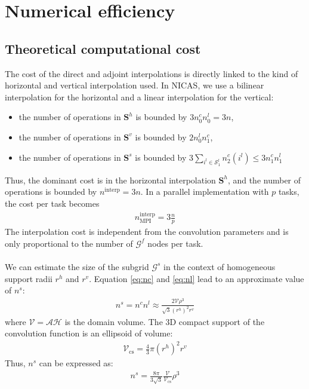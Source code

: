 \documentclass[12pt]{scrartcl}
\begin{document}
\section{Numerical efficiency}

\subsection{Theoretical computational cost}
The cost of the direct and adjoint interpolations is directly linked to the kind of horizontal and vertical interpolation used. In NICAS, we use a bilinear interpolation for the horizontal and a linear interpolation for the vertical:
\begin{itemize}
\item the number of operations in $\mathbf{S}^h$ is bounded by $3 n^c_0 n^l_0 = 3n$,
\item the number of operations in $\mathbf{S}^v$ is bounded by $2 n^l_0 n^c_1$,
\item the number of operations in $\mathbf{S}^s$ is bounded by $\displaystyle 3 \sum_{i^l \in \mathcal{S}^l_1} n^c_2(i^l) \le 3 n^c_1 n^l_1$
\end{itemize}
Thus, the dominant cost is in the horizontal interpolation $\mathbf{S}^h$, and the number of operations is bounded by $n^\mathrm{interp} = 3n$. In a parallel implementation with $p$ tasks, the cost per task becomes 
\begin{align}
n^\mathrm{interp}_\mathrm{MPI} = 3 \frac{n}{p}
\end{align}
The interpolation cost is independent from the convolution parameters and is only proportional to the number of $\mathcal{G}^f$ nodes per task.\\
$  $\\
We can estimate the size of the subgrid $\mathcal{G}^s$ in the context of homogeneous support radii $r^h$ and $r^v$. Equation \ref{eq:nc} and \ref{eq:nl} lead to an approximate value of $n^s$:
\begin{align}
n^s = n^c n^l \approx \frac{2 \mathcal{V} \rho^3}{\sqrt{3} \left(r^h\right)^2 r^v}
\end{align}
where $\mathcal{V} = \mathcal{A} \mathcal{H}$ is the domain volume. The 3D compact support of the convolution function is an ellipsoid of volume:
\begin{align}
\mathcal{V}_\mathrm{cs} = \frac{4}{3} \pi \left(r^h\right)^2 r^v
\end{align}
Thus, $n^s$ can be expressed as:
\begin{align}
n^s = \frac{8 \pi}{3\sqrt{3}} \frac{\mathcal{V}}{\mathcal{V}_\mathrm{cs}} \rho^3
\end{align}
\end{document}
